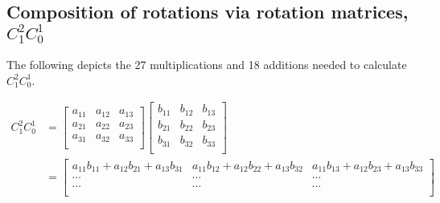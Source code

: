 
\begin{parts}
    \part{Composition of rotations via rotation matrices, $C_1^2C_0^1$}

    \solution
    The following depicts the 27 multiplications and 18 additions needed to calculate $C_1^2C_0^1$.

    \begin{equation*}
        \begin{split}
            C_1^2C_0^1 & =
            \begin{bmatrix}
                a_{11} & a_{12} & a_{13} \\
                a_{21} & a_{22} & a_{23} \\
                a_{31} & a_{32} & a_{33} \\
            \end{bmatrix}
            \begin{bmatrix}
                b_{11} & b_{12} & b_{13} \\
                b_{21} & b_{22} & b_{23} \\
                b_{31} & b_{32} & b_{33} \\
            \end{bmatrix} \\
            & =
            \begin{bmatrix}
                a_{11}b_{11}+a_{12}b_{21}+a_{13}b_{31} & a_{11}b_{12}+a_{12}b_{22}+a_{13}b_{32} & a_{11}b_{13}+a_{12}b_{23}+a_{13}b_{33} \\
                \cdots                                 & \cdots                                 & \cdots                                 \\
                \cdots                                 & \cdots                                 & \cdots                                 \\
            \end{bmatrix}
        \end{split}
    \end{equation*}


\end{parts}
